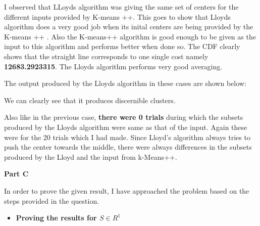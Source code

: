 \documentclass[11pt]{article}
\begin{document}
\begin{itemize}
I observed that LLoyds algorithm was giving the same set of centers for the different inputs provided by K-means ++. This goes to show that Lloyds algorithm does a very good job when its inital centers are being provided by the K-means ++ . Also the K-means++ algorithm is good enough to be given as the input to this algorithm and performs better when done so. The CDF clearly shows that the straight line corresponds to one single cost namely \textbf{12683.2923315}. The Lloyds algorithm performs very good averaging.

The output produced by the Lloyds algorithm in these cases are shown below:

\begin{figure}[H]%
	\centering
	\qquad
	\qquad
\end{figure}	

We can	clearly see that it produces discernible clusters.

Also like in the previous case, \textbf{ there were 0 trials } during which the subsets produced by the Lloyds algorithm were same as that of the input. Again these were for the 20 trials which I had made. Since Lloyd's algorithm always tries to push the center towards the middle, there were always differences in the subsets produced by the Lloyd and the input from k-Means++.


\textbf{Part C}

In order to prove the given result, I have approached the problem based on the steps provided in the question.

\begin{itemize}
	\item \textbf{ Proving the results for $S \in R ^1$}
	

\end{itemize}
\end{itemize}
\end{document}
